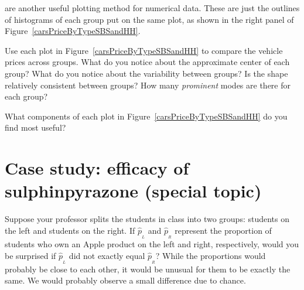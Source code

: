  are another useful plotting method for numerical data. These are just the outlines of histograms of each group put on the same plot, as shown in the right panel of Figure~\ref{carsPriceByTypeSBSandHH}.

\begin{exercise} \label{comparingPriceByTypeExercise}
Use each plot in Figure~\ref{carsPriceByTypeSBSandHH} to compare the vehicle prices across groups. What do you notice about the approximate center of each group? What do you notice about the variability between groups? Is the shape relatively consistent between groups? How many \emph{prominent} modes are there for each group?
\end{exercise}

\begin{exercise}
What components of each plot in Figure~\ref{carsPriceByTypeSBSandHH} do you find most useful?
\end{exercise}


\section{Case study: efficacy of sulphinpyrazone (special topic)}
\label{caseStudyOfSulphinpyrazone}



\begin{example}{Suppose your professor splits the students in class into two groups: students on the left and students on the right. If $\hat{p}_{_L}$ and $\hat{p}_{_R}$ represent the proportion of students who own an Apple product on the left and right, respectively, would you be surprised if $\hat{p}_{_L}$ did not {exactly} equal $\hat{p}_{_R}$?}\label{classRightLeftSideForHeight}
While the proportions would probably be close to each other, it would be unusual for them to be exactly the same. We would probably observe a small difference due to {chance}.
\end{example}

